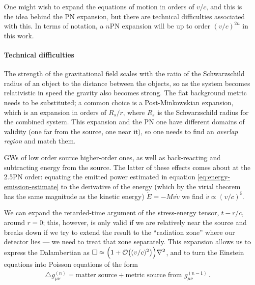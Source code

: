 \documentclass[main.tex]{subfiles}
\begin{document}
One might wish to expand the equations of motion in orders of \(v / c\), and this is the idea behind the \ac{PN} expansion, but there are technical difficulties associated with this. 
In terms of notation, a \(n\)PN expansion will be up to order \((v/c)^{2n}\) in this work.

\paragraph{Technical difficulties}

The strength of the gravitational field scales with the ratio of the Schwarzschild radius of an object to the distance between the objects, so as the system becomes relativistic in speed the gravity also becomes strong. 
The flat background metric needs to be substituted; a common choice is a Post-Minkowskian expansion, which is an expansion in orders of \(R_s / r\), where \(R_s\) is the Schwarzschild radius for the combined system. 
This expansion and the \ac{PN} one have different domains of validity (one far from the source, one near it), so one needs to find an \emph{overlap region} and match them.  

\acsp{GW} of low order source higher-order ones, as well as back-reacting and subtracting energy from the source. 
The latter of these effects comes about at the 2.5PN order: equating the emitted power estimated in equation \eqref{eq:energy-emission-estimate} to the derivative of the energy (which by the virial theorem has the same magnitude as the kinetic energy) \(\dot{E} = - M v \dot{v}\) we find  \(\dot{v} \propto (v/c)^{5}\). 

We can expand the retarded-time argument of the stress-energy tensor, \(t - r/c\), around \(r = 0\); this, however, is only valid if we are relatively near the source and breaks down if we try to extend the result to the ``radiation zone'' where our detector lies --- we need to treat that zone separately. 
This expansion allows us to express the Dalambertian as \(\square \approx \qty(1 + \order{(v/c)^2}) \nabla^2\), and to turn the Einstein equations into Poisson equations of the form 
%
\begin{align}
\triangle g_{\mu \nu }^{(n)} = \text{matter source} + \text{metric source from \(g_{\mu \nu}^{(n-1)}\)}
\,.
\end{align}
\end{document}
